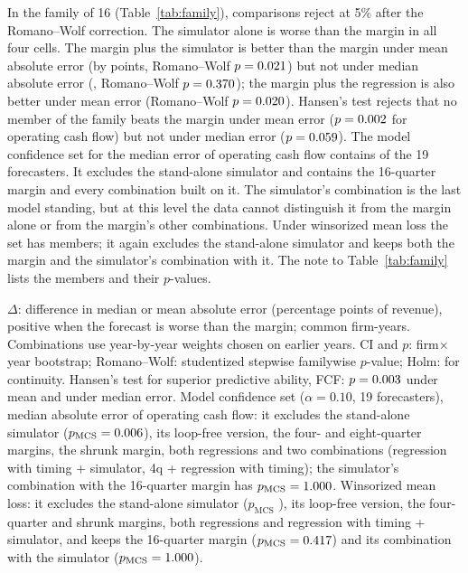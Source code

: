 \documentclass[preprint,12pt,authoryear]{elsarticle}
\begin{document}
In the family of 16 (Table~\ref{tab:family}), \FamRejects{} comparisons reject at 5\% after the Romano--Wolf correction. The simulator alone is worse than the margin in all four cells. The margin plus the simulator is better than the margin under mean absolute error (by \FamCombMeanDiff{} points, Romano--Wolf $p=0.021$) but not under median absolute error (\FamCombMedDiff, Romano--Wolf $p=0.370$); the margin plus the regression is also better under mean error (Romano--Wolf $p=0.020$). Hansen's test rejects that no member of the family beats the margin under mean error ($p=0.002$ for operating cash flow) but not under median error ($p=0.059$). The model confidence set for the median error of operating cash flow contains \McsSize{} of the 19 forecasters. It excludes the stand-alone simulator and contains the 16-quarter margin and every combination built on it. The simulator's combination is the last model standing, but at this level the data cannot distinguish it from the margin alone or from the margin's other combinations. Under winsorized mean loss the set has \McsMeanSize{} members; it again excludes the stand-alone simulator and keeps both the margin and the simulator's combination with it. The note to Table~\ref{tab:family} lists the members and their $p$-values.

\begin{table}[t]
\centering\scriptsize
\caption{The pre-specified family of 16 comparisons against the 16-quarter margin}
\label{tab:family}

\par\smallskip
\begin{minipage}{\linewidth}\footnotesize
$\Delta$: difference in median or mean absolute error (percentage points of revenue), positive when the forecast is worse than the margin; common firm-years. Combinations use year-by-year weights chosen on earlier years. CI and $p$: firm$\times$year bootstrap; Romano--Wolf: studentized stepwise familywise $p$-value; Holm: for continuity. Hansen's test for superior predictive ability, FCF: $p=0.003$ under mean and \SpaFcfMed{} under median error. Model confidence set ($\alpha=0.10$, 19 forecasters), median absolute error of operating cash flow: it excludes the stand-alone simulator ($p_{\mathrm{MCS}}=0.006$), its loop-free version, the four- and eight-quarter margins, the shrunk margin, both regressions and two combinations (regression with timing + simulator, 4q + regression with timing); the simulator's combination with the 16-quarter margin has $p_{\mathrm{MCS}}=1.000$. Winsorized mean loss: it excludes the stand-alone simulator ($p_{\mathrm{MCS}}$ \McsMeanTwinPrel), its loop-free version, the four-quarter and shrunk margins, both regressions and regression with timing + simulator, and keeps the 16-quarter margin ($p_{\mathrm{MCS}}=0.417$) and its combination with the simulator ($p_{\mathrm{MCS}}=1.000$).
\end{minipage}
\end{table}
\end{document}
